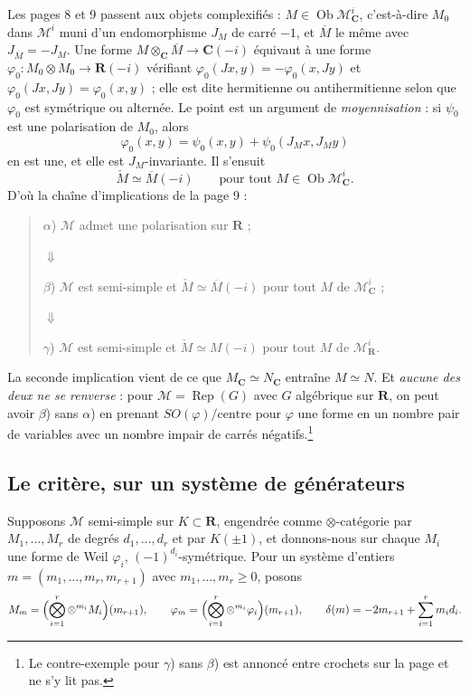 \documentclass[11pt,a4paper]{article}
\begin{document}
Les pages 8 et 9 passent aux objets complexifiés : $M \in
\operatorname{Ob}\mathcal{M}^{i}_{\mathbf{C}}$, c'est-à-dire $M_{0}$ dans
$\mathcal{M}^{i}$ muni d'un endomorphisme $J_{M}$ de carré $-1$, et
$\overline{M}$ le même avec $J_{\overline{M}} = -J_{M}$. Une forme $M
\otimes_{\mathbf{C}} \overline{M} \to \mathbf{C}(-i)$ équivaut à une forme
$\varphi_{0} \colon M_{0} \otimes M_{0} \to \mathbf{R}(-i)$ vérifiant
$\varphi_{0}(J x, y) = -\varphi_{0}(x, J y)$ et $\varphi_{0}(J x, J y) =
\varphi_{0}(x,y)$ ; elle est dite hermitienne ou antihermitienne selon que
$\varphi_{0}$ est symétrique ou alternée. Le point est un argument de
\emph{moyennisation} : si $\psi_{0}$ est une polarisation de $M_{0}$, alors
\[
\varphi_{0}(x,y) = \psi_{0}(x,y) + \psi_{0}(J_{M}x, J_{M}y)
\]
en est une, et elle est $J_{M}$-invariante. Il s'ensuit
\[
\check{M} \simeq \overline{M}(-i)
\qquad\text{pour tout } M \in
\operatorname{Ob}\mathcal{M}^{i}_{\mathbf{C}} .
\]
D'où la chaîne d'implications de la page 9 :
\begin{quote}
$\alpha$) $\mathcal{M}$ admet une polarisation sur $\mathbf{R}$ ;

$\Downarrow$

$\beta$) $\mathcal{M}$ est semi-simple et $\check{M} \simeq \overline{M}(-i)$
pour tout $M$ de $\mathcal{M}^{i}_{\mathbf{C}}$ ;

$\Downarrow$

$\gamma$) $\mathcal{M}$ est semi-simple et $\check{M} \simeq M(-i)$ pour tout
$M$ de $\mathcal{M}^{i}_{\mathbf{R}}$.
\end{quote}
La seconde implication vient de ce que $M_{\mathbf{C}} \simeq N_{\mathbf{C}}$
entraîne $M \simeq N$. Et \emph{aucune des deux ne se renverse} : pour
$\mathcal{M} = \operatorname{Rep}(G)$ avec $G$ algébrique sur $\mathbf{R}$, on
peut avoir $\beta$) sans $\alpha$) en prenant $SO(\varphi)/\text{centre}$ pour
$\varphi$ une forme en un nombre pair de variables avec un nombre impair de
carrés négatifs.\footnote{Le contre-exemple pour $\gamma$) sans $\beta$) est
annoncé entre crochets sur la page et ne s'y lit pas.}

\subsection*{Le critère, sur un système de générateurs}

Supposons $\mathcal{M}$ semi-simple sur $K \subset \mathbf{R}$, engendrée comme
$\otimes$-catégorie par $M_{1}, \ldots, M_{r}$ de degrés $d_{1}, \ldots,
d_{r}$ et par $K(\pm 1)$, et donnons-nous sur chaque $M_{i}$ une forme de Weil
$\varphi_{i}$, $(-1)^{d_{i}}$-symétrique. Pour un système d'entiers
$m = (m_{1}, \ldots, m_{r}, m_{r+1})$ avec $m_{1}, \ldots, m_{r} \geqslant 0$,
posons
\[
M_{m} = \Bigl( \bigotimes_{i=1}^{r} \otimes^{m_{i}} M_{i} \Bigr)(m_{r+1}) ,
\qquad
\varphi_{m} = \Bigl( \bigotimes_{i=1}^{r} \otimes^{m_{i}} \varphi_{i} \Bigr)(m_{r+1}) ,
\qquad
\delta(m) = -2 m_{r+1} + \sum_{i=1}^{r} m_{i} d_{i} .
\]
\end{document}
